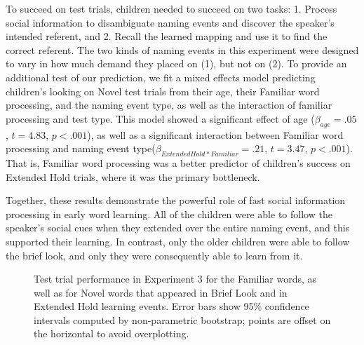 \documentclass{pnastwo}
\begin{document}
\begin{article}
To succeed on test trials, children needed to succeed on two tasks: 1. Process social information to disambiguate naming events and discover the speaker's intended referent, and 2. Recall the learned mapping and use it to find the correct referent. The two kinds of naming events in this experiment were designed to vary in how much demand they placed on (1), but not on (2). To provide an additional test of our prediction, we fit a mixed effects model predicting children's looking on Novel test trials from their age, their Familiar word processing, and the naming event type, as well as the interaction of familiar processing and test type. This model showed a significant effect of age ($\beta_{age} = .05$, $t = 4.83$, $p < . 001$), as well as a significant interaction between Familiar word processing and naming event type($\beta_{Extended Hold * Familiar} = .21$, $t = 3.47$, $p < . 001$). That is, Familiar word processing was a better predictor of children's success on Extended Hold trials, where it was the primary bottleneck. 


Together, these results demonstrate the powerful role of fast social information processing in early word learning. All of the children were able to follow the speaker's social cues when they extended over the entire naming event, and this supported their learning. In contrast, only the older children were able to follow the brief look, and only they were consequently able to learn from it. 


\begin{figure}[h]
	\caption{\label{fig:soc_word_test} Test trial performance in Experiment 3 for the Familiar words, as well as for Novel words that appeared in Brief Look and in Extended Hold learning events. Error bars show 95\% confidence intervals computed by non-parametric bootstrap; points are offset on the horizontal to avoid overplotting.}
\end{figure}


\end{article}
\end{document}
